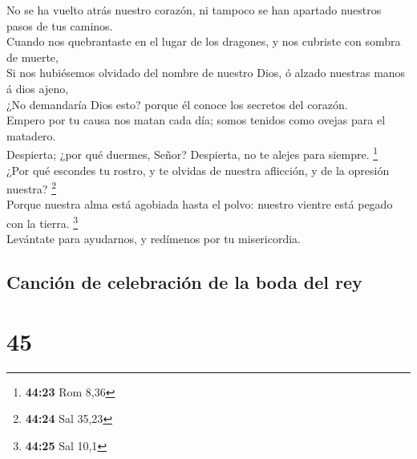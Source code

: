  No se ha vuelto atrás nuestro corazón, ni tampoco se han
apartado nuestros pasos de tus caminos.\\
 Cuando nos quebrantaste en el lugar de los dragones, y
nos cubriste con sombra de muerte,\\
 Si nos hubiésemos olvidado del nombre de nuestro Dios, ó
alzado nuestras manos á dios ajeno,\\
 ¿No demandaría Dios esto? porque él conoce los secretos
del corazón.\\
 Empero por tu causa nos matan cada día; somos tenidos
como ovejas para el matadero.\\
 Despierta; ¿por qué duermes, Señor? Despierta, no te
alejes para siempre. \footnote{\textbf{44:23} Rom 8,36}\\
 ¿Por qué escondes tu rostro, y te olvidas de nuestra
aflicción, y de la opresión nuestra? \footnote{\textbf{44:24} Sal 35,23}\\
 Porque nuestra alma está agobiada hasta el polvo:
nuestro vientre está pegado con la tierra. \footnote{\textbf{44:25} Sal
  10,1}\\
 Levántate para ayudarnos, y redímenos por tu
misericordia.

\hypertarget{canciuxf3n-de-celebraciuxf3n-de-la-boda-del-rey}{%
\subsection{Canción de celebración de la boda del
rey}\label{canciuxf3n-de-celebraciuxf3n-de-la-boda-del-rey}}

\hypertarget{section-44}{%
\section{45}\label{section-44}}

